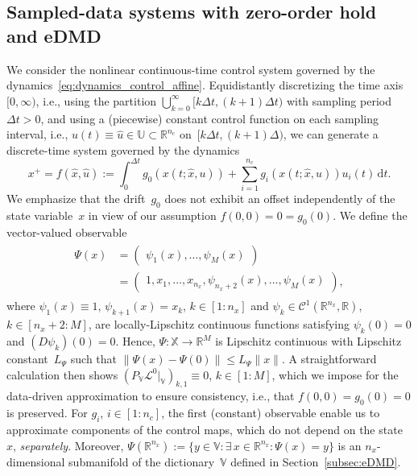 \documentclass{article}
\numberwithin{equation}{section}
\newcommand{\nx}{n_x}
\newcommand{\nc}{n_c}
\newcommand{\N}{M}
\newcommand{\bX}{\mathbb X}
\newcommand{\bU}{\mathbb U}
\begin{document}
	
	
	\subsection{Sampled-data systems with zero-order hold and eDMD}\label{subsec:sampled}
	
	We consider the nonlinear continuous-time control system governed by the dynamics~\eqref{eq:dynamics_control_affine}. Equidistantly discretizing the time axis~$[0,\infty)$, i.e., using the partition $\bigcup_{k=0}^\infty [k \Delta t, (k+1) \Delta t)$ with sampling period~$\Delta t > 0$, and using a (piecewise) constant control function on each sampling interval, i.e., $u(t) \equiv \hat{u} \in \bU \subset \mathbb{R}^{\nc}$ on~$[k \Delta t, (k+1) \Delta)$, we can generate a discrete-time system governed by the dynamics
	\begin{equation}\label{eq:dynamics_sampled_data}
	x^+ = f(\hat{x},\hat{u}) := \int_0^{\Delta t} g_0(x(t;\hat{x},u)) + \sum_{i=1}^{\nc} g_i(x(t;\hat{x},u)) u_i(t)\,\mathrm{d}t.
	\end{equation}
	We emphasize that the drift~$g_0$ does not exhibit an offset independently of the state variable~$x$ in view of our assumption $f(0,0) = 0 = g_0(0)$.
	We define the vector-valued observable
	\begin{align}\label{eq:dictionary}
	\begin{split}
	\Psi(x) &= \begin{pmatrix}
	\psi_1(x),\ldots,\psi_\N(x)
	\end{pmatrix} \\&= \begin{pmatrix}
	1, x_1,\ldots,x_{\nx},\psi_{\nx+2}(x),\ldots,\psi_\N(x)
	\end{pmatrix},
	\end{split}
	\end{align}
	where $\psi_1(x)\equiv 1$, $\psi_{k+1}(x) = x_k$, $k \in [1:\nx]$ and $\psi_k \in \mathcal{C}^1(\mathbb{R}^{\nx},\mathbb{R})$, $k \in [\nx + 2:\N]$, are locally-Lipschitz continuous functions satisfying $\psi_k(0) = 0$ and $(D \psi_k)(0) = 0$. 
	Hence, $\Psi:\bX \to \mathbb{R}^\N$ is Lipschitz continuous with Lipschitz constant~$L_\Psi$ such that $\| \Psi(x) - \Psi(0) \| \leq L_\Psi \| x \|$. A straightforward calculation then shows $(P_{\mathbb{V}} \mathcal{L}^0|_{\mathbb{V}})_{k,1} \equiv 0$, $k \in [1:\N]$, %
	which we %
	impose for the data-driven approximation to ensure consistency, i.e., that $f(0,0) = g_0(0) = 0$ is preserved. For $g_i$, $i \in [1:n_c]$, the first (constant) observable enable us to approximate components of the control maps, which do not depend on the state~$x$, \textit{separately}.  Moreover, $\Psi(\mathbb{R}^{\nx}) := \{ y \in \mathbb{V}: \exists\,x \in \mathbb{R}^{\nx}: \Psi(x) = y\}$ is an $\nx$-dimensional submanifold of the dictionary~$\mathbb{V}$ defined in Section~\ref{subsec:eDMD}. 
\end{document}
